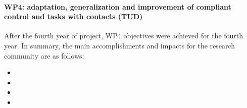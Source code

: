 

\paragraph*{WP4: adaptation, generalization and improvement of compliant control and tasks with contacts (TUD)}

After the fourth year of project, WP4 objectives were achieved for the fourth year. In summary, the main accomplishments and impacts for the research community are as follows: 


\begin{itemize}

\item 
\item 
\item 
\item 

 \end{itemize}
